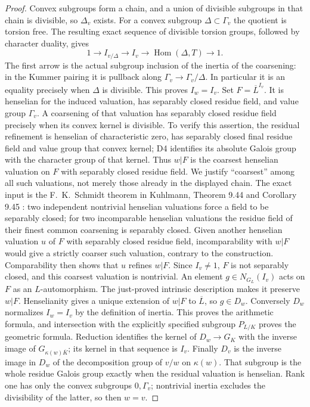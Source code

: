 \begin{proof}
Convex subgroups form a chain, and a union of divisible subgroups in that chain is divisible, so $\Delta_v$ exists. For a convex subgroup $\Delta\subset\Gamma_v$ the quotient is torsion free. The resulting exact sequence of divisible torsion groups, followed by character duality, gives
\[
 1\longrightarrow I_{v/\Delta}\longrightarrow I_v
 \longrightarrow\operatorname{Hom}(\Delta,T)\longrightarrow1.
\]
The first arrow is the actual subgroup inclusion of the inertia of the coarsening: in the Kummer pairing it is pullback along $\Gamma_v\to\Gamma_v/\Delta$. In particular it is an equality precisely when $\Delta$ is divisible. This proves $I_w=I_v$.
Set $F=\overline L^{I_v}$. It is henselian for the induced valuation, has separably closed residue field, and value group $\Gamma_v$. A coarsening of that valuation has separably closed residue field precisely when its convex kernel is divisible. To verify this assertion, the residual refinement is henselian of characteristic zero, has separably closed final residue field and value group that convex kernel; D4 identifies its absolute Galois group with the character group of that kernel. Thus $w|F$ is the coarsest henselian valuation on $F$ with separably closed residue field.
We justify ``coarsest'' among all such valuations, not merely those already in the displayed chain. The exact input is the F.~K.~Schmidt theorem in Kuhlmann, Theorem 9.44 and Corollary 9.45 \cite{DE_KuhlmannHensel}: two independent nontrivial henselian valuations force a field to be separably closed; for two incomparable henselian valuations the residue field of their finest common coarsening is separably closed. Given another henselian valuation $u$ of $F$ with separably closed residue field, incomparability with $w|F$ would give a strictly coarser such valuation, contrary to the construction. Comparability then shows that $u$ refines $w|F$. Since $I_v\ne1$, $F$ is not separably closed, and this coarsest valuation is nontrivial.
An element $g\in N_{G_L}(I_v)$ acts on $F$ as an $L$-automorphism. The just-proved intrinsic description makes it preserve $w|F$. Henselianity gives a unique extension of $w|F$ to $\overline L$, so $g\in D_w$. Conversely $D_w$ normalizes $I_w=I_v$ by the definition of inertia. This proves the arithmetic formula, and intersection with the explicitly specified subgroup $P_{L/K}$ proves the geometric formula. Reduction identifies the kernel of $D_w\to G_K$ with the inverse image of $G_{\kappa(w)\overline K}$; its kernel in that sequence is $I_v$. Finally $D_v$ is the inverse image in $D_w$ of the decomposition group of $v/w$ on $\kappa(w)$. That subgroup is the whole residue Galois group exactly when the residual valuation is henselian. Rank one has only the convex subgroups $0,\Gamma_v$; nontrivial inertia excludes the divisibility of the latter, so then $w=v$.
\end{proof}


